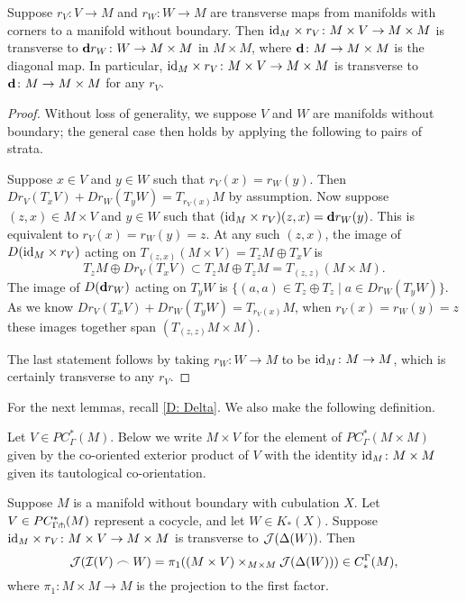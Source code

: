 \begin{lemma}\label{L: M times transverse diag}
	Suppose $r_V \colon V \to M$ and $r_W \colon W \to M$ are transverse maps from manifolds with corners to a manifold without boundary.
	Then $\mathrm{id}_M \times r_V \colon M \times V \to M \times M$ is transverse to $\mathbf{d} r_W \colon W \to M \times M$ in $M \times M$, where $\mathbf{d} \colon M \to M \times M$ is the diagonal map.
	In particular, $\mathrm{id}_M \times r_V \colon M \times V \to M \times M$ is transverse to $\mathbf{d} \colon M \to M \times M$ for any $r_V$.
\end{lemma}

\begin{proof}
	Without loss of generality, we suppose $V$ and $W$ are manifolds without boundary; the general case then holds by applying the following to pairs of strata.

	Suppose $x \in V$ and $y \in W$ such that $r_V(x) = r_W(y)$.
	Then $Dr_V(T_xV)+Dr_W(T_yW) = T_{r_V(x)}M$ by assumption.
	Now suppose $(z,x) \in M \times V$ and $y \in W$ such that $(\mathrm{id}_M \times r_V) (z,x) = \mathbf{d} r_W(y)$.
	This is equivalent to $r_V(x) = r_W(y) = z$.
	At any such $(z,x)$, the image of $D(\mathrm{id}_M \times r_V)$ acting on $T_{(z,x)}(M \times V) = T_zM \oplus T_xV$ is $$T_zM \oplus Dr_V(T_xV) \subset T_zM \oplus T_zM = T_{(z,z)}(M \times M).$$
	The image of $D(\mathbf{d} r_W)$ acting on $T_yW$ is $\{(a,a) \in T_z \oplus T_z \mid a \in Dr_W(T_yW)\}$.
	As we know $Dr_V(T_xV)+Dr_W(T_yW) = T_{r_V(x)}M$, when $r_V(x) = r_W(y) = z$ these images together span $(T_{(z,z)}M \times M)$.

	The last statement follows by taking $r_W \colon W \to M$ to be $\mathrm{id}_M \colon M \to M$, which is certainly transverse to any $r_V$.
\end{proof}

For the next lemmas, recall \cref{D: Delta}.
We also make the following definition.

\begin{definition}
	Let $V \in PC^*_\Gamma(M)$.
	Below we write $M \times V$ for the element of $PC^*_\Gamma(M \times M)$ given by the co-oriented exterior product of $V$ with the identity $\mathrm{id}_M \colon M \times M$ given its tautological co-orientation.
\end{definition}

\begin{lemma}\label{L: image of cubical cap}
	Suppose $M$ is a manifold without boundary with cubulation $X$.
	Let $V \in PC^*_{\Gamma\pitchfork}(M)$ represent a cocycle, and let $W \in K_*(X)$.
	Suppose $\mathrm{id}_M \times r_V \colon M \times V \to M \times M$ is transverse to $\mathcal{J}(\Delta(W))$.
	Then $$\mathcal{J}(\mathcal{I}(V)\frown W) = \pi_1( (M \times V)\times_{M \times M}\mathcal{J}(\Delta(W))) \in C_*^\Gamma(M),$$
	where $\pi_1 \colon M \times M \to M$ is the projection to the first factor.
\end{lemma}

